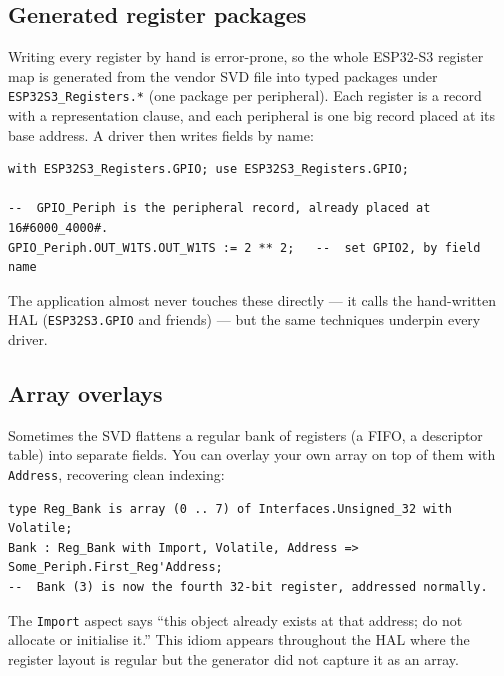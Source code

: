 
\subsection{Generated register packages}

Writing every register by hand is error-prone, so the whole ESP32-S3 register map
is generated from the vendor SVD file into typed packages under
\texttt{ESP32S3\_Registers.*} (one package per peripheral). Each register is a
record with a representation clause, and each peripheral is one big record placed
at its base address. A driver then writes fields by name:

\begin{lstlisting}
with ESP32S3_Registers.GPIO; use ESP32S3_Registers.GPIO;

--  GPIO_Periph is the peripheral record, already placed at 16#6000_4000#.
GPIO_Periph.OUT_W1TS.OUT_W1TS := 2 ** 2;   --  set GPIO2, by field name
\end{lstlisting}

The application almost never touches these directly --- it calls the hand-written
HAL (\texttt{ESP32S3.GPIO} and friends) --- but the same techniques underpin every
driver.

\subsection{Array overlays}

Sometimes the SVD flattens a regular bank of registers (a FIFO, a descriptor
table) into separate fields. You can overlay your own array on top of them with
\texttt{Address}, recovering clean indexing:

\begin{lstlisting}
type Reg_Bank is array (0 .. 7) of Interfaces.Unsigned_32 with Volatile;
Bank : Reg_Bank with Import, Volatile, Address => Some_Periph.First_Reg'Address;
--  Bank (3) is now the fourth 32-bit register, addressed normally.
\end{lstlisting}

The \texttt{Import} aspect says ``this object already exists at that address; do
not allocate or initialise it.'' This idiom appears throughout the HAL where the
register layout is regular but the generator did not capture it as an array.

